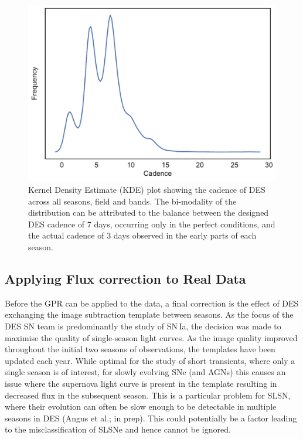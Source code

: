 \begin{figure}
  \includegraphics[width=\textwidth]{Figures/Chapter5/Cadence.pdf}
  \caption{Kernel Density Estimate (KDE) plot showing the cadence of DES across all seasons, field and bands. The bi-modality of the distribution can be attributed to the balance between the designed DES cadence of 7 days, occurring only in the perfect conditions, and the actual cadence of 3 days observed in the early parts of each season.}
  \label{fig:cadence}
\end{figure}

\subsection{Applying Flux correction to Real Data}
Before the GPR can be applied to the data, a final correction is the effect of DES exchanging the image subtraction template between seasons. As the focus of the DES SN team is predominantly the study of SN\,Ia, the decision was made to maximise the quality of single-season light curves. As the image quality improved throughout the initial two seasons of observations, the templates have been updated each year. While optimal for the study of short transients, where only a single season is of interest, for slowly evolving SNe (and AGNs) this causes an issue where the supernova light curve is present in the template resulting in decreased flux in the subsequent season. This is a particular problem for SLSN, where their evolution can often be slow enough to be detectable in multiple seasons in DES (Angus et al.; in prep). This could potentially be a factor leading to the misclassification of SLSNe and hence cannot be ignored.

